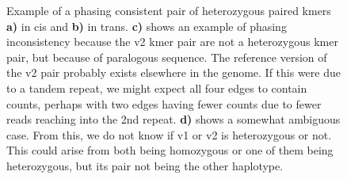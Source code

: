 \begin{figure}[htbp!]
{\label{fig:d}
}

\par{
Example of a phasing consistent pair of heterozygous paired kmers \textbf{a)} in cis and \textbf{b)} in trans. \textbf{c)} shows an example of phasing inconsistency because the v2 kmer pair are not a heterozygous kmer pair, but because of paralogous sequence. The reference version of the v2 pair probably exists elsewhere in the genome. If this were due to a tandem repeat, we might expect all four edges to contain counts, perhaps with two edges having fewer counts due to fewer reads reaching into the 2nd repeat. \textbf{d)} shows a somewhat ambiguous case. From this, we do not know if v1 or v2 is heterozygous or not. This could arise from both being homozygous or one of them being heterozygous, but its pair not being the other haplotype.
}
\end{figure}

